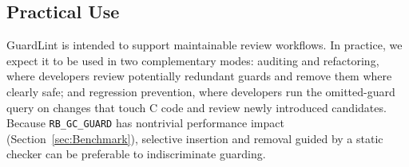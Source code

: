 \subsection{Practical Use}
GuardLint is intended to support maintainable review workflows. In practice, we expect it to be used in two complementary modes: auditing and refactoring, where developers review potentially redundant guards and remove them where clearly safe; and regression prevention, where developers run the omitted-guard query on changes that touch C code and review newly introduced candidates. Because \texttt{RB\_GC\_GUARD} has nontrivial performance impact (Section~\ref{sec:Benchmark}), selective insertion and removal guided by a static checker can be preferable to indiscriminate guarding.
